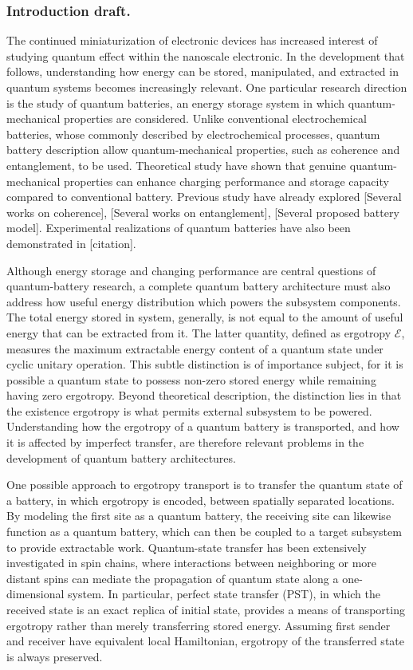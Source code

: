 \documentclass[../../../main.tex]{subfiles}
\begin{document}
\subsubsection{Introduction draft.}

The continued miniaturization of electronic devices has increased interest of studying quantum effect within the nanoscale electronic.
In the development that follows, understanding how energy can be stored, manipulated, and extracted in quantum systems becomes increasingly relevant.
One particular research direction is the study of quantum batteries, an energy storage system in which quantum-mechanical properties are considered.
Unlike conventional electrochemical batteries, whose commonly described by electrochemical processes, quantum battery  description allow quantum-mechanical properties, such as coherence and entanglement, to be used.
Theoretical study have shown that genuine quantum-mechanical properties can enhance charging performance and storage capacity compared to conventional battery.
Previous study have already explored [Several works on coherence], [Several works on entanglement], [Several proposed battery model].
Experimental realizations of quantum batteries have also been demonstrated in [citation].

Although energy storage and changing performance are central questions of quantum-battery research, a complete quantum battery architecture must also address how useful energy distribution which powers the subsystem components.
The total energy stored in system, generally, is not equal to the amount of useful energy  that can be extracted from it.
The latter quantity, defined as ergotropy $\mathcal{E}$, measures the maximum extractable energy content of a quantum state under cyclic unitary operation.
This subtle distinction is of importance subject, for it is possible a quantum state to possess non-zero stored energy while remaining having zero ergotropy.
Beyond theoretical description, the distinction lies in that the existence ergotropy is what permits external subsystem to be powered.
Understanding how the ergotropy of a quantum battery is transported, and how it is affected by imperfect transfer, are therefore relevant problems in the development of quantum battery architectures.

One possible approach to ergotropy transport is to transfer the quantum state of a battery, in which ergotropy is encoded, between spatially separated locations.
By modeling the first site as a quantum battery, the receiving site can likewise function as a quantum battery, which can then be coupled to a target subsystem to provide extractable work.
Quantum-state transfer has been extensively investigated in spin chains, where interactions between neighboring or more distant spins can mediate the propagation of quantum state along a one-dimensional system.
In particular, perfect state transfer (PST), in which the received state is an exact replica of initial state, provides a means of transporting ergotropy rather than merely transferring stored energy.
Assuming first sender and receiver have equivalent local Hamiltonian, ergotropy of the transferred state is always preserved.
\end{document}
